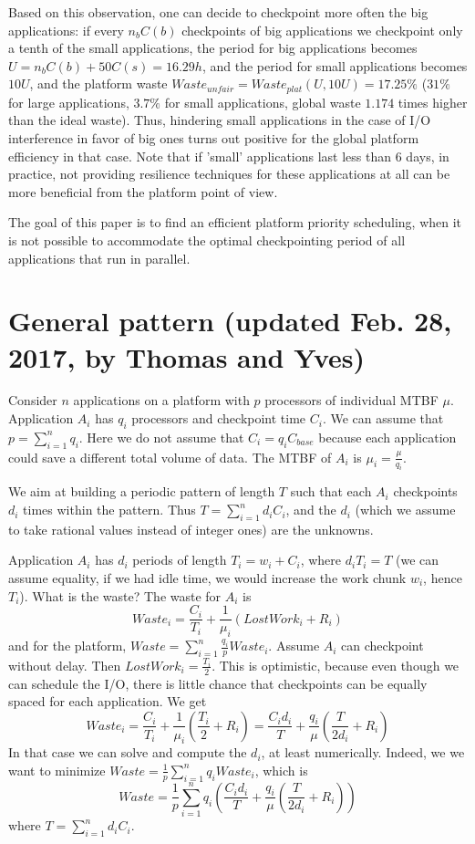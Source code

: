 \documentclass{article}
\begin{document}
Based on this observation, one can decide to checkpoint more often the big applications: if every $n_bC(b)$ checkpoints of big applications we checkpoint only a tenth of the small applications, the period for big applications becomes $U = n_bC(b)+50C(s) = 16.29h$, and the period for small applications becomes $10U$, and the platform waste $Waste_{unfair} = Waste_{plat}(U, 10U) = 17.25\%$ ($31\%$ for large applications, $3.7\%$ for small applications, global waste $1.174$ times higher than the ideal waste). Thus, hindering small applications in the case of I/O interference in favor of big ones turns out positive for the global platform efficiency in that case. Note that if 'small' applications last less than 6 days, in practice, not providing resilience techniques for these applications at all can be more beneficial from the platform point of view.

The goal of this paper is to find an efficient platform priority scheduling, when it is not possible to accommodate the optimal checkpointing period of all applications that run in parallel.


\section{General pattern (updated Feb. 28, 2017, by Thomas and Yves)}

Consider $n$ applications on a platform with $p$ processors of individual MTBF $\mu$.
 Application $A_{i}$ has $q_{i}$ processors and checkpoint time $C_{i}$. We can
 assume that $p = \sum_{i=1}^{n} q_{i}$.
Here we do not assume that $C_{i} = q_{i} C_{\textit{base}}$ because each application could save a different total volume of data. The MTBF of $A_{i}$ is $\mu_{i} = \frac{\mu}{q_{i}}$.

We aim at building a periodic pattern of length $T$ such that each $A_{i}$ checkpoints $d_{i}$ times
within the pattern. Thus $T  = \sum_{i=1}^{n} d_{i} C_{i}$, and the $d_{i}$ (which we assume
to take rational values instead of integer ones) are the unknowns. 

Application $A_{i}$ has $d_{i}$ periods of length $T_{i } = w_{i}+C_{i}$, where 
$d_{i} T_{i} =T$
(we can assume equality, if we had idle time, we would increase the work chunk $w_{i}$, hence $T_{i}$).
What is the waste? The waste for $A_{i}$ is 
$$Waste_{i} = \frac{C_{i}}{T_{i}} + \frac{1}{\mu_{i}} (LostWork_{i} + R_{i})$$
and for the platform, $Waste = \sum_{i=1}^{n} \frac{q_{i}}{p} Waste_{i}$.
Assume $A_{i}$ can checkpoint without delay. Then $LostWork_{i} = \frac{T_{i}}{2}$.
This is  optimistic, because even though we can schedule the I/O, there is little chance that checkpoints can be equally spaced for each application.
We get
$$Waste_{i} = \frac{C_{i}}{T_{i}} + \frac{1}{\mu_{i}} (\frac{T_{i}}{2} + R_{i})
= \frac{C_{i} d_{i}}{T}+ \frac{q_{i}}{\mu} (\frac{T}{2d_{i}} + R_{i})$$
In that case we can solve and compute the $d_{i}$, at least numerically. 
Indeed, we we want to minimize 
$Waste = \frac{1}{p} \sum_{i=1}^{n} q_{i} Waste_{i}$, 
which is 
$$Waste = \frac{1}{p} \sum_{i=1}^{n} q_{i} (\frac{C_{i} d_{i}}{T}+ \frac{q_{i}}{\mu} (\frac{T}{2d_{i}} + R_{i}))$$
where $T  = \sum_{i=1}^{n} d_{i} C_{i}$.
\end{document}

